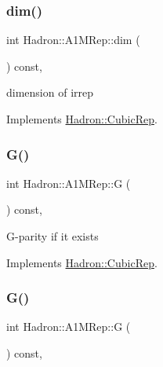 \subsubsection{\texorpdfstring{dim()}{dim()}\hspace{0.1cm}{\footnotesize\ttfamily [3/3]}}
{\footnotesize\ttfamily int Hadron\+::\+A1\+M\+Rep\+::dim (\begin{DoxyParamCaption}{ }\end{DoxyParamCaption}) const\hspace{0.3cm}{\ttfamily [inline]}, {\ttfamily [virtual]}}

dimension of irrep 

Implements \mbox{\hyperlink{structHadron_1_1CubicRep_ac178d14064f037a66af4b9fb4b312d51}{Hadron\+::\+Cubic\+Rep}}.

\mbox{\label{structHadron_1_1A1MRep_ab4115cbdcbc20fdc0641d1dc82da3f2f}} 
\subsubsection{\texorpdfstring{G()}{G()}\hspace{0.1cm}{\footnotesize\ttfamily [1/3]}}
{\footnotesize\ttfamily int Hadron\+::\+A1\+M\+Rep\+::G (\begin{DoxyParamCaption}{ }\end{DoxyParamCaption}) const\hspace{0.3cm}{\ttfamily [inline]}, {\ttfamily [virtual]}}

G-\/parity if it exists 

Implements \mbox{\hyperlink{structHadron_1_1CubicRep_a52104e43266d1614c00bbd1c3b395458}{Hadron\+::\+Cubic\+Rep}}.

\mbox{\label{structHadron_1_1A1MRep_ab4115cbdcbc20fdc0641d1dc82da3f2f}} 
\subsubsection{\texorpdfstring{G()}{G()}\hspace{0.1cm}{\footnotesize\ttfamily [2/3]}}
{\footnotesize\ttfamily int Hadron\+::\+A1\+M\+Rep\+::G (\begin{DoxyParamCaption}{ }\end{DoxyParamCaption}) const\hspace{0.3cm}{\ttfamily [inline]}, {\ttfamily [virtual]}}

